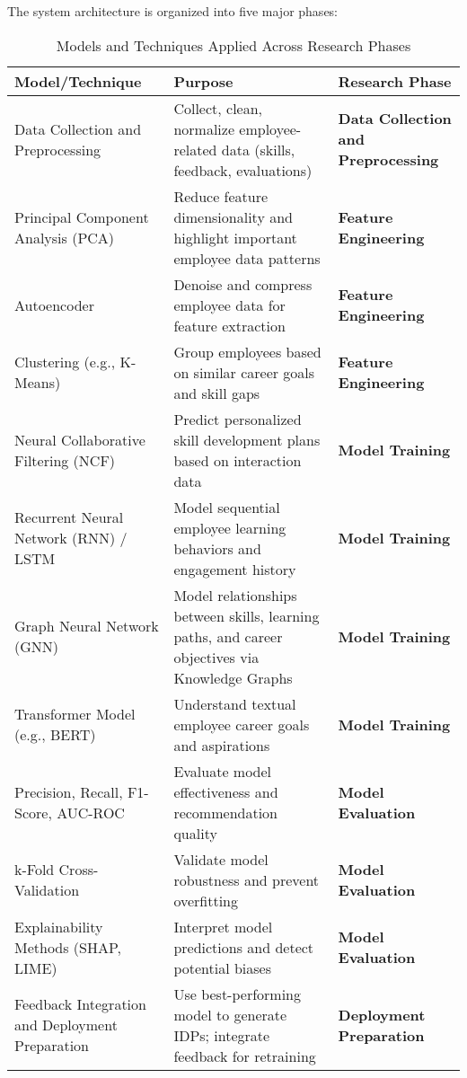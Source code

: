 The system architecture is organized into five major phases:
\begin{table}[H]
\centering
\caption{Models and Techniques Applied Across Research Phases}
\label{tab:models_summary}
\begin{tabular}{@{}p{6cm}p{6cm}p{4cm}@{}}
\toprule
\textbf{Model/Technique} & \textbf{Purpose} & \textbf{Research Phase} \\
\midrule
\rowcolor{blue!10}
Data Collection and Preprocessing & Collect, clean, normalize employee-related data (skills, feedback, evaluations) & \textbf{Data Collection and Preprocessing} \\
\midrule
\rowcolor{cyan!15}
Principal Component Analysis (PCA) & Reduce feature dimensionality and highlight important employee data patterns & \textbf{Feature Engineering} \\
\rowcolor{cyan!15}
Autoencoder & Denoise and compress employee data for feature extraction & \textbf{Feature Engineering} \\
\rowcolor{cyan!15}
Clustering (e.g., K-Means) & Group employees based on similar career goals and skill gaps & \textbf{Feature Engineering} \\
\midrule
\rowcolor{orange!20}
Neural Collaborative Filtering (NCF) & Predict personalized skill development plans based on interaction data & \textbf{Model Training} \\
\rowcolor{orange!20}
Recurrent Neural Network (RNN) / LSTM & Model sequential employee learning behaviors and engagement history & \textbf{Model Training} \\
\rowcolor{orange!20}
Graph Neural Network (GNN) & Model relationships between skills, learning paths, and career objectives via Knowledge Graphs & \textbf{Model Training} \\
\rowcolor{orange!20}
Transformer Model (e.g., BERT) & Understand textual employee career goals and aspirations & \textbf{Model Training} \\
\midrule
\rowcolor{green!20}
Precision, Recall, F1-Score, AUC-ROC & Evaluate model effectiveness and recommendation quality & \textbf{Model Evaluation} \\
\rowcolor{green!20}
k-Fold Cross-Validation & Validate model robustness and prevent overfitting & \textbf{Model Evaluation} \\
\rowcolor{green!20}
Explainability Methods (SHAP, LIME) & Interpret model predictions and detect potential biases & \textbf{Model Evaluation} \\
\midrule
\rowcolor{yellow!20}
Feedback Integration and Deployment Preparation & Use best-performing model to generate IDPs; integrate feedback for retraining & \textbf{Deployment Preparation} \\
\bottomrule
\end{tabular}



\end{table}




